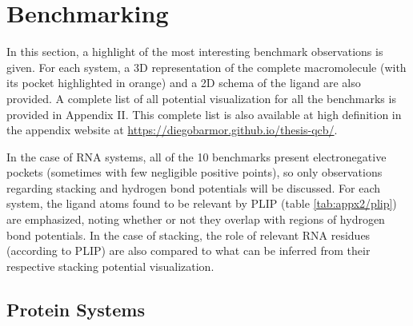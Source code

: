 \section{Benchmarking}
  In this section, a highlight of the most interesting benchmark observations is given. For each system, a 3D representation of the complete macromolecule (with its pocket highlighted in orange) and a 2D schema of the ligand are also provided. A complete list of all potential visualization for all the benchmarks is provided in Appendix II. This complete list is also available at high definition in the appendix website at \url{https://diegobarmor.github.io/thesis-qcb/}.

  In the case of RNA systems, all of the 10 benchmarks present electronegative pockets (sometimes with few negligible positive points), so only observations regarding stacking and hydrogen bond potentials will be discussed. For each system, the ligand atoms found to be relevant by PLIP (table \ref{tab:appx2/plip}) are emphasized, noting whether or not they overlap with regions of hydrogen bond potentials. In the case of stacking, the role of relevant RNA residues (according to PLIP) are also compared to what can be inferred from their respective stacking potential visualization.

  \pagebreak
  \subsection{Protein Systems}

